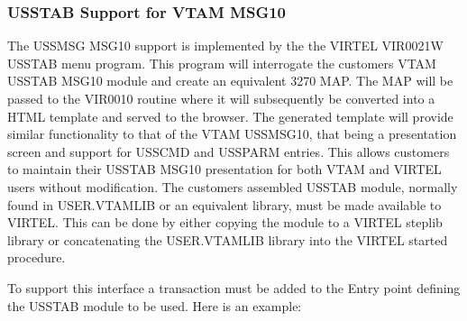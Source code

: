 \documentclass[letterpaper,10pt,english]{sphinxmanual}
\begin{document}
\subsubsection{USSTAB Support for VTAM MSG10}
\label{\detokenize{Installation_Guide:usstab-support-for-vtam-msg10}}\label{\detokenize{Installation_Guide:index-26}}
\sphinxAtStartPar
The USSMSG MSG10 support is implemented by the the VIRTEL VIR0021W USSTAB menu program. This program will interrogate the customers VTAM USSTAB MSG10 module and create an equivalent 3270 MAP. The MAP will be passed to the VIR0010 routine where it will subsequently be converted into a HTML template and served to the browser. The generated template will provide similar functionality to that of the VTAM USSMSG10, that being a presentation screen and support for USSCMD and USSPARM entries. This allows customers to maintain their USSTAB MSG10 presentation for both VTAM and VIRTEL users without modification. The customers assembled USSTAB module, normally found in USER.VTAMLIB or an equivalent library, must be made available to VIRTEL. This can be done by either copying the module to a VIRTEL steplib library or concatenating the USER.VTAMLIB library into the VIRTEL started procedure.

\sphinxAtStartPar
To support this interface a transaction must be added to the Entry point defining the USSTAB module to be used. Here is an example:\sphinxhyphen{}

\begin{sphinxVerbatim}[commandchars=\\\{\}]
      
 
 
 
 
 
 
 
\end{sphinxVerbatim}

\sphinxAtStartPar
{}

\sphinxAtStartPar
{}
\end{document}
